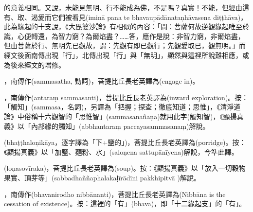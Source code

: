 \startitemgroup[noteitems]
\item{}的意義相同。又說，未能見無明、行不能成為佛，不是嗎？真實！不能，但經由這有、取、渴愛而它們被看見(iminā pana te bhavaupādānataṇhāvasena diṭṭhāva)，此為緣起的十支說，《大毘婆沙論》有相似的內容：「問：菩薩何故逆觀緣起唯至於識，心便轉還，為智力窮？為爾焰盡？……答，應作是說：非智力窮，非爾焰盡，但由菩薩於行、無明先已觀故，謂：先觀有即已觀行；先觀愛取已，觀無明。」而經文後面南傳出現「行」，北傳出現「行」與「無明」，顯然與這裡所說難相應，或為後來經文的增修。
\stopitemgroup

\startitemgroup[noteitems]
\item{}，南傳作(sammasatha, 動詞)，菩提比丘長老英譯為(engage in)。
\stopitemgroup

\startitemgroup[noteitems]
\item{}，南傳作(antaraṃ sammasanti)，菩提比丘長老英譯為(inward exploration)。按：「觸知」(sammasa，名詞)，另譯為「把握；探查；徹底知道；思惟」，《清淨道論》中俗稱十六觀智的「思惟智」(sammasanañāṇa)就用此字(觸知智)，《顯揚真義》以「內部緣的觸知」(abbhantaraṃ paccayasammasanaṃ)解說。
\stopitemgroup

\startitemgroup[noteitems]
\item{}(bhaṭṭhaloṇikāya，逐字譯為「下+鹽的」)，菩提比丘長老英譯為(porridge)。按：《顯揚真義》以「加鹽、麵粉、水」(saloṇena sattupānīyena)解說，今準此譯。
\stopitemgroup

\startitemgroup[noteitems]
\item{}(loṇasovīraka)，菩提比丘長老英譯為(soup)。按：《顯揚真義》以「放入一切穀物果實、頂芽等」(sabbadhaññaphalakaḷīrādīni pakkhipitvā )解說。
\stopitemgroup

\startitemgroup[noteitems]
\item{}，南傳作(bhavanirodho nibbānanti)，菩提比丘長老英譯為(Nibbāna is the cessation of existence)。按：這裡的「有」(bhava)，即「十二緣起支」的「有」。
\stopitemgroup

